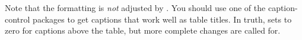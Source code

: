 \documentclass[a4paper]{article}
\begin{document}
Note that the  formatting is \emph{not} adjusted by
.  You should use one of the caption-control
packages to get captions that work well as table titles.  In truth,
 sets  to zero for
captions above the table, but more complete changes are called for.
\end{document}
